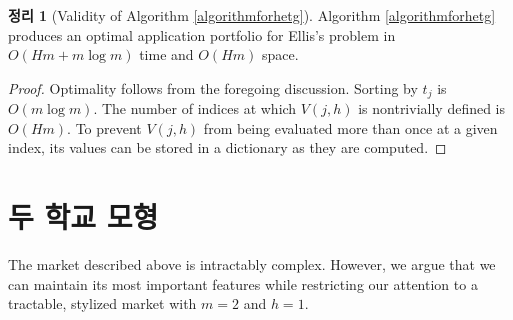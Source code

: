 \documentclass[12pt]{article} %
\newif\ifEN
\newtheorem{theorem}{Theorem}
\theoremstyle{definition}
\newtheorem{theorem}{정리}
\theoremstyle{definition}
\begin{document}
\begin{theorem}[Validity of Algorithm \ref{algorithmforhetg}]
Algorithm \ref{algorithmforhetg} produces an optimal application portfolio for Ellis's problem in $O(H m + m \log m)$ time and $O(H m)$ space.
\end{theorem}

\begin{proof}
Optimality follows from the foregoing discussion. Sorting by $t_j$ is $O(m \log m)$.  The number of indices at which $V(j, h)$ is nontrivially defined is $O(Hm)$. To prevent $V(j, h)$ from being evaluated more than once at a given index, its values can be stored in a dictionary as they are computed.
\end{proof}




























\ifEN \section{Two-school model} \else \section{두 학교 모형} \fi
The market described above is intractably complex. However, we argue that we can maintain its most important features while restricting our attention to a tractable, stylized market with $m=2$ and $h=1$. 
\end{document}
